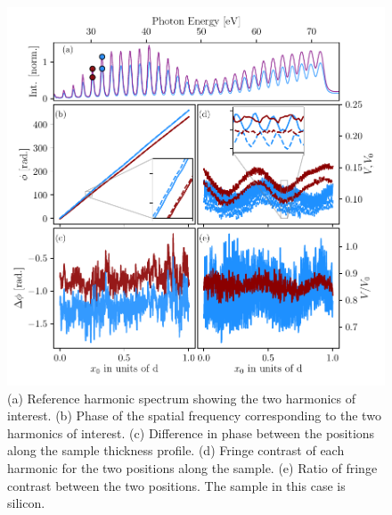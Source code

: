 \begin{figure}
	\centering
	\includegraphics[width=1.0\textwidth]{figures/refractive_index/phase_fringe_extraction.pdf}
	\caption[Fringe shift and fringe  contrast extracted from SWPG scan]{(a) Reference harmonic spectrum showing the two harmonics of interest. (b) Phase of the spatial frequency corresponding to the two harmonics of interest. (c) Difference in phase between the positions along the sample thickness profile. (d) Fringe contrast of each harmonic for the two positions along the sample.  (e) Ratio of fringe contrast between the two positions.  The sample in this case is silicon.}
	\label{fig:phase_fringe_extraction}
\end{figure}

